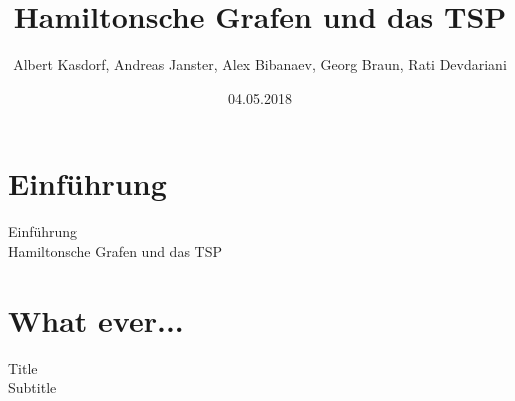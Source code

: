 \documentclass{beamer}
\title[Hamiltonsche Grafen und das TSP]{Hamiltonsche Grafen und das TSP}
\author[]
{
	Albert Kasdorf, Andreas Janster, Alex Bibanaev, Georg Braun, Rati Devdariani
}
\institute[FH Aachen]
{
	FH Aachen\\
	Fachbereich Elektrotechnik und Informationstechnik\\
	Ingenieur-Informatik
}
\date{04.05.2018}
\begin{document}
%
%
\frame{\titlepage}


%
%


%
% 
%
\part{Einführung}


%
%
%
\begin{frame}{Einführung\\\normalsize{Hamiltonsche Grafen und das TSP}}
\end{frame}


%
% 
%
\part{What ever... }


%
%
%
\begin{frame}{Title\\\normalsize{Subtitle}}
\end{frame}


%
% 
%
\end{document}
